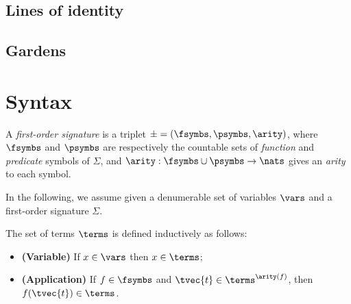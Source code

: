 
\subsection{Lines of identity}

\subsection{Gardens}

\section*{Syntax}


\begin{definition}
  A \emph{first-order signature} is a triplet $\mathcal{\Sigma} = (
  \fsymbs, \psymbs, \arity )$, where $\fsymbs$ and $\psymbs$ are
  respectively the countable sets of \emph{function} and \emph{predicate}
  symbols of $\Sigma$, and $\arity : \fsymbs \cup \psymbs \to \nats$ gives an
  \emph{arity} to each symbol.
\end{definition}

In the following, we assume given a denumerable set of variables $\vars$
and a first-order signature $\Sigma$.

\begin{definition}[Terms]
  The set of terms $\terms$ is defined inductively as follows:
  \begin{itemize}
    \item{\textbf{(Variable)}} If $x \in \vars$ then $x \in \terms$;
    \item{\textbf{(Application)}} If $f \in \fsymbs$ and $\tvec{t}
    \in \terms^{\arity(f)}$, then $f(\tvec{t}) \in \terms$.
  \end{itemize}
\end{definition}


